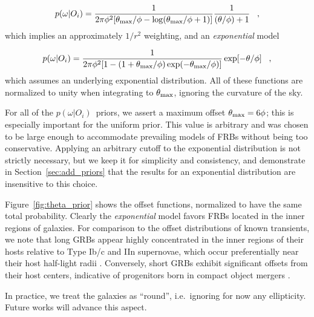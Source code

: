 \documentclass[twocolumn,linenumbers]{aastex63}
\newcommand{\mhalflight}{\phi} %
\newcommand{\mthmax}{\theta_{\rm max}}  %
\newcommand{\mpoffset}{p(\omega|O_i)}  %
\newcommand{\poffset}{$\mpoffset$}
\begin{document}
\begin{equation}
    \mpoffset = 
    \frac{1}{2 \pi \phi^2 [\mthmax/\phi - \log(\mthmax/\phi + 1)]}
    \frac{1}{(\theta/\mhalflight) + 1} \;\;\; ,
\label{eqn:poff_core}
\end{equation}
which implies an approximately $1/r^2$ weighting,
and an {\it exponential} model

\begin{equation}
    \mpoffset = 
    \frac{1}{2 \pi \phi^2 [1 - (1 + \mthmax/\phi) \exp(-\mthmax/\phi)]}
    \exp[-\theta/\mhalflight] \;\;\; ,
\label{eqn:poff_exp}
\end{equation}
which assumes an underlying exponential distribution.
All of these functions are normalized to 
unity when integrating to $\theta_{\rm max}$, ignoring
the curvature of the sky.%

For all of the \poffset\ priors, we assert a maximum
offset $\mthmax = 6 \mhalflight$; this is especially
important for the uniform prior.  
This value is arbitrary and was chosen to 
be large enough to accommodate prevailing models of
FRBs without being too conservative.
Applying an arbitrary 
cutoff to the exponential distribution is not strictly
necessary, but we keep it for simplicity and consistency, 
and demonstrate in Section~\ref{sec:add_priors} that the 
results for an exponential distribution are insensitive 
to this choice.

Figure~\ref{fig:theta_prior} shows the offset functions,
normalized to have the same total probability.
Clearly the {\it exponential} model favors FRBs located in the inner
regions of galaxies.
For comparison to the offset distributions of known transients, we note that long GRBs appear highly concentrated in the inner regions of their hosts relative to Type Ib/c and IIn supernovae, which occur preferentially near their host half-light radii \citep{Lunnan15,Blanchard16}. Conversely, short GRBs exhibit significant offsets from their host centers, indicative of progenitors born in compact object mergers \citep{Fong13}.  


In practice,  we treat the galaxies as ``round'',
i.e.\ ignoring for now any ellipticity.
Future works will advance this aspect.
\end{document}
